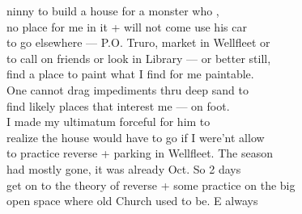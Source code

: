 \documentclass[11pt,a4paper]{article}
\begin{document}
{ninny to build a house for a monster who , \\
no place for me in it + will not come use his car \\
to go elsewhere --- P.O. Truro, market in Wellfleet or \\
to call on friends or look in Library --- or better still, \\
find a place to paint what I find for me paintable. \\
One cannot drag impediments thru deep sand to \\
find likely places that interest me --- on foot. \\
\quad I made my ultimatum  forceful for him to \\
realize the house would have to go if I were'nt allow \\
to practice reverse + parking in Wellfleet. The season \\
had mostly gone, it was already Oct. So 2 days \\
get on to the theory of reverse + some practice on the big \\
open space where old  Church used to be. E always}








\end{document}
